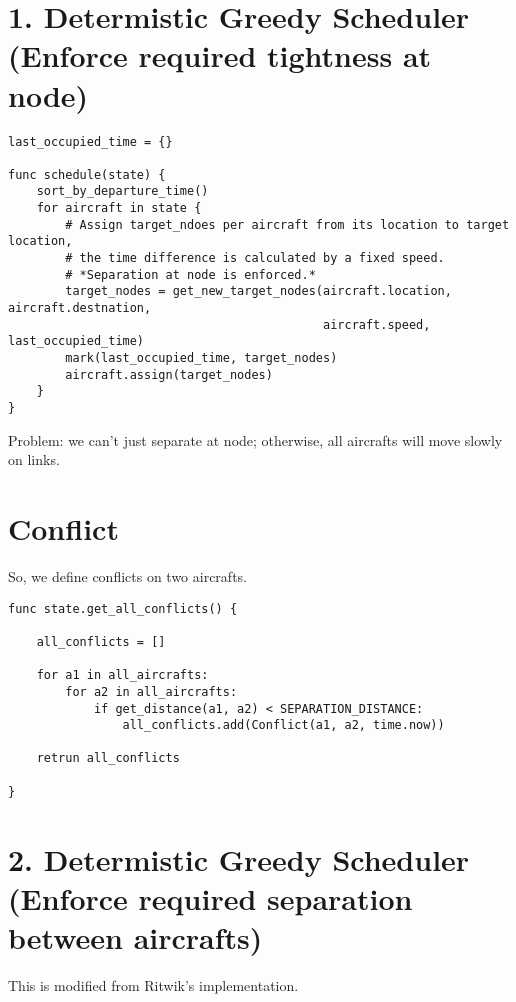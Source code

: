 \documentclass[]{article} \usepackage[margin=0.6in]{geometry} \setlength{\columnsep}{0.2in} \pagenumbering{gobble}
\date{}
\begin{document}
\section{1. Determistic Greedy Scheduler (Enforce required tightness at
node)}\label{determistic-greedy-scheduler-enforce-required-tightness-at-node}

\begin{verbatim}
last_occupied_time = {}

func schedule(state) {
    sort_by_departure_time()
    for aircraft in state {
        # Assign target_ndoes per aircraft from its location to target location,
        # the time difference is calculated by a fixed speed.
        # *Separation at node is enforced.*
        target_nodes = get_new_target_nodes(aircraft.location, aircraft.destnation,
                                            aircraft.speed, last_occupied_time)
        mark(last_occupied_time, target_nodes)
        aircraft.assign(target_nodes)
    }
}
\end{verbatim}

Problem: we can't just separate at node; otherwise, all aircrafts will
move slowly on links.

\section{Conflict}\label{conflict}

So, we define conflicts on two aircrafts.

\begin{verbatim}
func state.get_all_conflicts() {

    all_conflicts = []

    for a1 in all_aircrafts:
        for a2 in all_aircrafts:
            if get_distance(a1, a2) < SEPARATION_DISTANCE:
                all_conflicts.add(Conflict(a1, a2, time.now))

    retrun all_conflicts

}
\end{verbatim}

\section{2. Determistic Greedy Scheduler (Enforce required separation
between
aircrafts)}\label{determistic-greedy-scheduler-enforce-required-separation-between-aircrafts}

This is modified from Ritwik's implementation.
\end{document}

